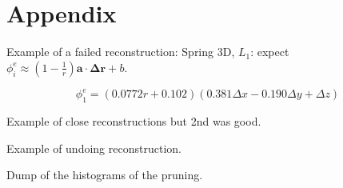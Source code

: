 \documentclass[11pt]{article}
\begin{document}
    \section{Appendix}
    Example of a failed reconstruction:
    Spring 3D, $L_1$: expect $\phi^{e}_i \approx (1-\frac{1}{r})\mathbf{a} \cdot \mathbf{\Delta r} + b$.
    
    $$\phi^{e}_1 = (0.0772r + 0.102)(0.381 \Delta x - 0.190 \Delta y + \Delta z)$$

    Example of close reconstructions but 2nd was good.

    Example of undoing reconstruction.

    Dump of the histograms of the pruning.

    

  
\end{document}
